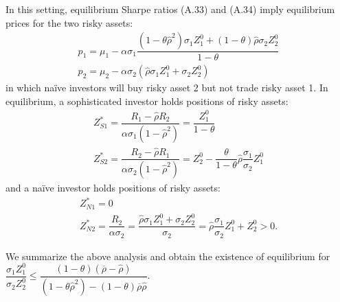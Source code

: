 \documentclass[10pt]{article}
\begin{document}
In this setting, equilibrium Sharpe ratios (A.33) and (A.34) imply equilibrium prices for the two risky assets:
\begin{eqnarray}
& p_1 = \mu_1 - \alpha \sigma_1 \dfrac{(1 - \theta {\hat \rho}^2) \sigma_1 Z_1^0 + (1 - \theta) {\hat \rho} \sigma_2 Z_2^0}{1 - \theta} & \\
& p_2 = \mu_2 - \alpha \sigma_2 ({\hat \rho} \sigma_1 Z_1^0 + \sigma_2 Z_2^0) &
\end{eqnarray}
in which na\"ive investors will buy risky asset 2 but not trade risky asset 1. In equilibrium, a sophisticated investor holds positions of risky assets:
\begin{eqnarray}
& Z_{S 1}^* = \dfrac{R_1 - \hat \rho R_2}{\alpha \sigma_1 (1 - \hat \rho^2)} = \dfrac{Z_1^0}{1 - \theta} & \\
& Z_{S 2}^* = \dfrac{R_2 - \hat \rho R_1}{\alpha \sigma_2 (1 - \hat \rho^2)} = Z_2^0 - \dfrac{\theta}{1 - \theta} {\hat \rho} \dfrac{\sigma_1}{\sigma_2} Z_1^0 &
\end{eqnarray}
and a na\"ive investor holds positions of risky assets:
\begin{eqnarray}
& Z_{N 1}^* = 0 & \\
& Z_{N 2}^* = \dfrac{R_2}{\alpha \sigma_2} = \dfrac{{\hat \rho} \sigma_1 Z_1^0 + \sigma_2 Z_2^0}{\sigma_2} = {\hat \rho} \dfrac{\sigma_1}{\sigma_2} Z_1^0 + Z_2^0 > 0. &
\end{eqnarray}

We summarize the above analysis and obtain the existence of equilibrium for $ \dfrac{\sigma_1 Z_1^0}{\sigma_2 Z_2^0} \leqslant \dfrac{(1 - \theta) (\overline{\rho} - {\hat \rho})}{(1 - \theta {\hat \rho}^2) - (1 - \theta) \overline{\rho} {\hat \rho}} $.
\end{document}
